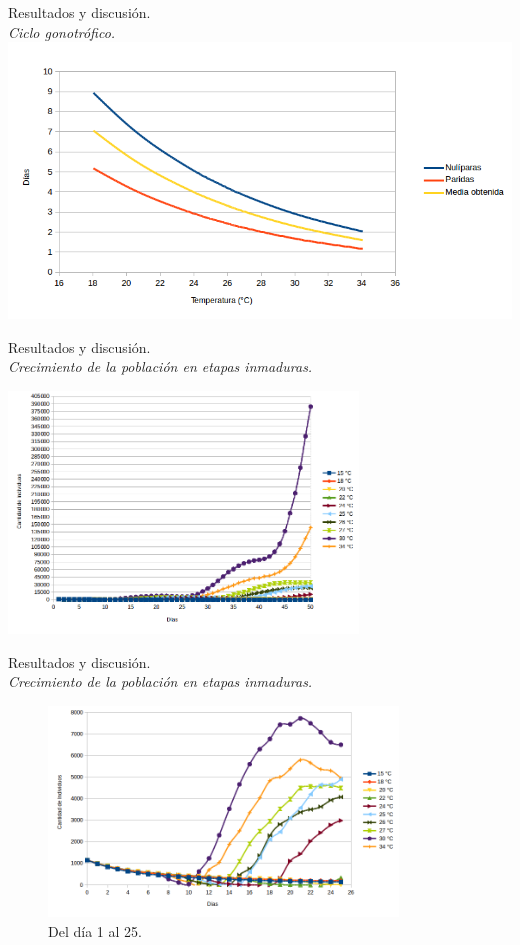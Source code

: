 \begin{frame}[t]{Resultados y discusión.\\\textit{Ciclo gonotrófico.}}
    \includegraphics[width=\textwidth]{./graphics/ciclo-gonotrofico-temperatura.png}
\end{frame}


\begin{frame}[t]{Resultados y discusión.\\\textit{Crecimiento de la población en etapas inmaduras.}}
\begin{center}
    \includegraphics[width=9.3cm]{./graphics/evolucion-poblacion-all.png}
\end{center}
\end{frame}

\begin{frame}[t]{Resultados y discusión.\\\textit{Crecimiento de la población en etapas inmaduras.}}
\begin{center}
\begin{figure}
     \includegraphics[width=9.3cm]{./graphics/poblacion-inmadura-p1.png}
     \caption{Del día 1 al 25.}
\end{figure}
\end{center}
\end{frame}

